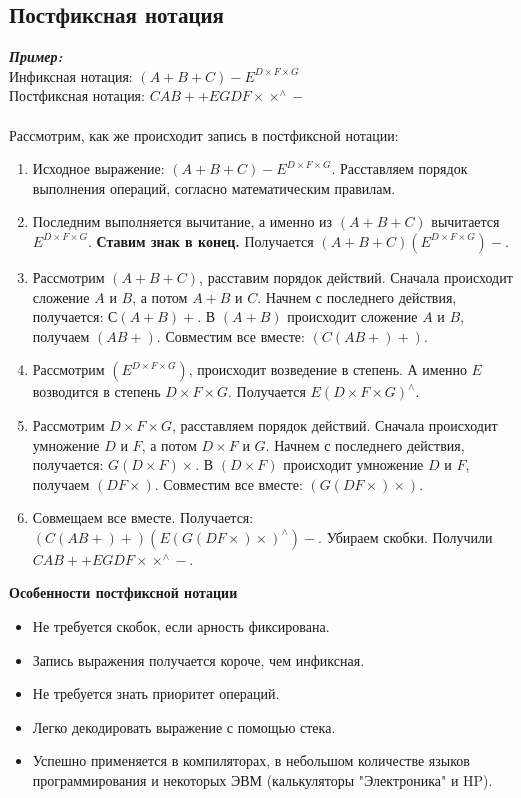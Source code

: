 \subsection{Постфиксная нотация}
\textbf{\emph{Пример:}}
\\Инфиксная нотация: $(A + B + C) - E^{D\times F\times G}$
\\Постфиксная нотация: $CAB++EGDF\times\times ^{\wedge}-$
\\
\\Рассмотрим, как же происходит запись в постфиксной нотации:
\begin{enumerate}
\item Исходное выражение: $(A + B + C) - E^{D\times F\times G}$. Расставляем порядок выполнения операций, согласно математическим правилам.
\item Последним выполняется вычитание, а именно из $(A + B + C)$ вычитается $E^{D\times F\times G}$. \textbf{Ставим знак в конец.} Получается $(A + B + C)(E^{D\times F\times G})-$.
\item Рассмотрим $(A + B + C)$, расставим порядок действий. Сначала происходит сложение $A$ и $B$, а потом $A+B$ и $C$. Начнем с последнего действия, получается: $С(A+B)+$. В $(A+B)$ происходит сложение $A$ и $B$, получаем $(AB+)$. Совместим все вместе: $(C(AB+)+)$.
\item Рассмотрим $(E^{D\times F\times G})$, происходит возведение в степень. А именно $E$ возводится в степень $D\times F\times G$. Получается $E(D\times F\times G)^{\wedge}$.
\item Рассмотрим $D\times F\times G$, расставляем порядок действий. Сначала происходит умножение $D$ и $F$, а потом $D\times F$ и $G$. Начнем с последнего действия, получается: $G(D \times F)\times$. В $(D \times F)$ происходит умножение $D$ и $F$, получаем $(DF\times)$. Совместим все вместе: $(G(DF\times )\times)$.
\item Совмещаем все вместе. Получается: $(C(AB+)+)(E(G(DF\times)\times)^{\wedge})-$. Убираем скобки. Получили $CAB++EGDF\times\times ^{\wedge}-$.
\end{enumerate}
\begin{center}
  \textbf{Особенности постфиксной нотации}
\end{center}
\begin{itemize}
  \item Не требуется скобок, если арность фиксирована.
  \item Запись выражения получается короче, чем инфиксная.
  \item Не требуется знать приоритет операций.
  \item Легко декодировать выражение с помощью стека.
  \item Успешно применяется в компиляторах, в небольшом количестве языков программирования и некоторых ЭВМ (калькуляторы "Электроника" и HP).
\end{itemize}
